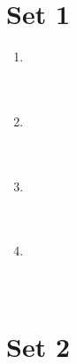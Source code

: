 \documentclass[11pt]{article}
\theoremstyle{definition}
\newcommand{\fdbox}[2]{\fbox{\sffamily\LARGE\vphantom y#1: \bfseries #2} \par\vspace{1em}} %
\begin{document}
\newcommand{\logo}{%
\begin{minipage}[b]{22em}
\centering\noindent
\\[0.5em]
\begin{minipage}[t][4em][t]{12em} \centering
{\huge \bfseries ${\bf 27^{\text{th}}}$ TJIMO } \\
\textsc{\large Alexandria, Virginia}
\end{minipage}
\end{minipage}
\vspace*{-0.05em}
}
\newcommand{\sevenpoints}{}
\newcommand{\righthead}{\fdbox{Round}{Guts}\fdbox{Team Number}{\phantom{00}}}

\section*{Set 1}

\begin{multicols*}{1}
 \begin{enumerate} 
\setcounter{enumi}{0}

\item \underline{\phantom{000000000000000}} \\ \\ \\
\item \underline{\phantom{000000000000000}} \\ \\ \\
\item \underline{\phantom{000000000000000}} \\ \\ \\
\item \underline{\phantom{000000000000000}} \\ \\ \\

\end{enumerate} \end{multicols*}

\eject

\section*{Set 2}
\end{document}
